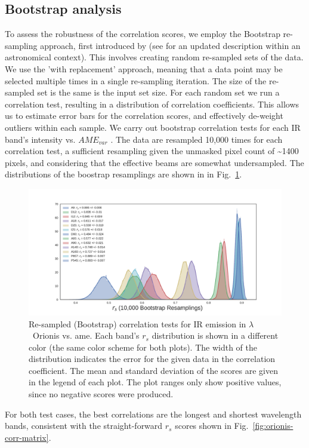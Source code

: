    \subsection{Bootstrap analysis}
        To assess the robustness of the correlation scores, we employ the Bootstrap re-sampling approach, first introduced by \cite{efron79} (see \cite{feigelson13} for an updated description within an astronomical context). This involves creating random re-sampled sets of the data. We use the 'with replacement' approach, meaning that a data point may be selected multiple times in a single re-sampling iteration. The size of the re-sampled set is the same is the input set size. For each random set we run a correlation test, resulting in a distribution of correlation coefficients. This allows us to estimate error bars for the correlation scores, and effectively de-weight outliers within each sample.
        We carry out bootstrap correlation tests for each IR band's intensity vs. $AME_{var}$ . The data are resampled 10,000 times for each correlation test, a sufficient resampling given the unmasked pixel count of \textasciitilde{}1400 pixels, and considering that the effective beams are somewhat undersampled.  The distributions of the boostrap resamplings are shown in in Fig.~\ref{fig:bootstrap_vs_AME}.
            \begin{figure}
              \includegraphics[width=\textwidth,trim={3cm 0.25cm 2.5cm 1cm},clip]{../Plots/ch_lori/bootstrap_vs_AME_spearman_i10000.pdf}
              \centering
              \caption{Re-sampled (Bootstrap) correlation tests for IR emission in $\lambda$~Orionis vs. \acrshort{ame}. Each band's $r_{s}$ distribution is shown in a different color (the same color scheme for both plots). The width of the distribution indicates the error for the given data in the correlation coefficient. The mean and standard deviation of the scores are given in the legend of each plot. The plot ranges only show positive values, since no negative scores were produced. }
              \label{fig:bootstrap_vs_AME}
            \end{figure}
        For both test cases, the best correlations are the longest and shortest wavelength bands, consistent with the straight-forward $r_{s}$ scores shown in Fig.~\ref{fig:orionis-corr-matrix}.

